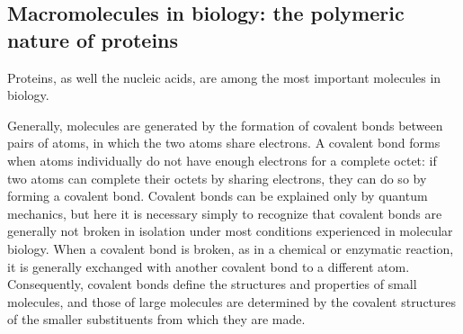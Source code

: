\subsection{Macromolecules in biology: the polymeric nature of proteins}\label{ssec:polym-prot}
Proteins, as well the nucleic acids, are among the most important molecules in biology. 

Generally, molecules are generated by the formation of covalent bonds between pairs of atoms, in which the two atoms share electrons. A covalent bond forms when atoms individually do not have enough electrons for a complete octet: if two atoms can complete their octets by sharing electrons, they can do so by forming a covalent bond. Covalent bonds can be explained only by quantum mechanics, but here it is necessary simply to recognize that covalent bonds are generally not broken in isolation under most conditions experienced in molecular biology. When a covalent bond is broken, as in a chemical or enzymatic reaction, it is generally exchanged with another covalent bond to a different atom. Consequently, covalent bonds define the structures and properties of small molecules, and those of large molecules are determined by the covalent structures of the smaller substituents from which they are made.

%
%


